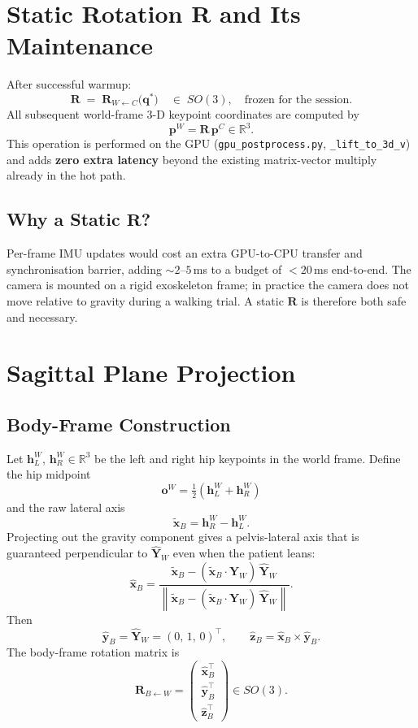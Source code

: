 \documentclass[11pt, a4paper]{article}
\newcommand{\R}{\mathbb{R}}
\newcommand{\vv}[1]{\bm{#1}}          %
\newcommand{\mat}[1]{\mathbf{#1}}     %
\newcommand{\quat}[1]{\bm{#1}}        %
\newcommand{\norm}[1]{\left\lVert #1 \right\rVert}
\newcommand{\Rtrans}[2]{\mat{R}_{#1 \leftarrow #2}}  %
\theoremstyle{definition}
\begin{document}
\section{Static Rotation $\mat{R}$ and Its Maintenance}

After successful warmup:
\[
  \boxed{
    \mat{R} \;=\; \Rtrans{W}{C}\!\bigl(\quat{q}^*\bigr)
    \quad\in\; SO(3), \quad \text{frozen for the session.}
  }
\]
All subsequent world-frame 3-D keypoint coordinates are computed by
\[
  \vv{p}^W = \mat{R}\,\vv{p}^C \in \R^3.
\]
This operation is performed on the GPU (\texttt{gpu\_postprocess.py},
\texttt{\_lift\_to\_3d\_v}) and adds \textbf{zero extra latency} beyond the
existing matrix-vector multiply already in the hot path.

\subsection*{Why a Static $\mat{R}$?}
Per-frame IMU updates would cost an extra GPU-to-CPU transfer and synchronisation
barrier, adding $\sim\!2$--$5$\,ms to a budget of $<20$\,ms end-to-end.
The camera is mounted on a rigid exoskeleton frame; in practice the camera does
not move relative to gravity during a walking trial.  A static $\mat{R}$ is
therefore both safe and necessary.

\section{Sagittal Plane Projection}
\label{sec:sagittal}

\subsection{Body-Frame Construction}

Let $\vv{h}_L^W,\,\vv{h}_R^W \in \R^3$ be the left and right hip keypoints in
the world frame.  Define the hip midpoint
\[
  \vv{o}^W = \tfrac{1}{2}\!\left(\vv{h}_L^W + \vv{h}_R^W\right)
\]
and the raw lateral axis
\[
  \tilde{\vv{x}}_B = \vv{h}_R^W - \vv{h}_L^W.
\]
Projecting out the gravity component gives a pelvis-lateral axis that is
guaranteed perpendicular to $\hat{\vv{Y}}_W$ even when the patient leans:
\[
  \hat{\vv{x}}_B
    = \frac{\tilde{\vv{x}}_B - (\tilde{\vv{x}}_B \cdot \hat{\vv{Y}}_W)\,\hat{\vv{Y}}_W}
           {\norm{\tilde{\vv{x}}_B - (\tilde{\vv{x}}_B \cdot \hat{\vv{Y}}_W)\,\hat{\vv{Y}}_W}}.
\]
Then
\[
  \hat{\vv{y}}_B = \hat{\vv{Y}}_W = (0,\,1,\,0)^\top, \qquad
  \hat{\vv{z}}_B = \hat{\vv{x}}_B \times \hat{\vv{y}}_B.
\]
The body-frame rotation matrix is
\[
  \Rtrans{B}{W} =
  \begin{pmatrix} \hat{\vv{x}}_B^\top \\ \hat{\vv{y}}_B^\top \\ \hat{\vv{z}}_B^\top \end{pmatrix}
  \in SO(3).
\]
\end{document}
